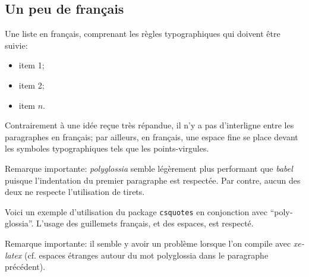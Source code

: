 \documentclass[11pt, a4paper, english]{article}
\begin{document}
	
	\begin{french}%
		
		\subsection{Un peu de français}
		
			Une liste en français, comprenant les règles typographiques qui doivent être suivie:
			\begin{itemize}
				\item item 1;
				\item item 2;
				\item item $n$.
			\end{itemize}
			
			Contrairement à une idée reçue très répandue, il n'y a pas d'interligne entre les paragraphes en français; par ailleurs, en français, une espace fine se place devant les symboles typographiques tels que les points-virgules.
			
			Remarque importante: \textit{polyglossia} semble légèrement plus performant que \textit{babel} puisque l'indentation du premier paragraphe est respectée. Par contre, aucun des deux ne respecte l'utilisation de tirets.
			
			Voici un exemple d'utilisation du package \texttt{csquotes} en conjonction avec \enquote{polyglossia}. L'usage des guillemets français, et des espaces, est respecté.
			
			Remarque importante: il semble y avoir un problème lorsque l'on compile avec \textit{xelatex} (cf. espaces étranges autour du mot polyglossia dans le paragraphe précédent).
	\end{french}
	
	
\end{document}
